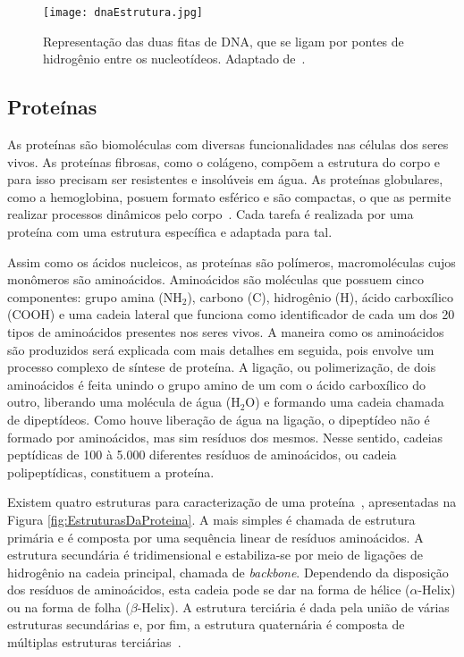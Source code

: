 \begin{figure}[h]
    \centering
    \texttt{[image: dnaEstrutura.jpg]}
    \caption{Representação das duas fitas de DNA, que se ligam por pontes de hidrogênio entre os nucleotídeos. Adaptado de~\cite{dnadiscovery08}.}
    \label{fig:EstruturasDoDNA}
\end{figure} 



\subsection{Proteínas} \label{proteinas}

\indent As proteínas são biomoléculas com diversas funcionalidades nas células dos seres vivos. As proteínas fibrosas, como o colágeno, compõem a estrutura do corpo e para isso precisam ser resistentes e insolúveis em água. As proteínas globulares, como a hemoglobina, posuem formato esférico e são compactas, o que as permite realizar processos dinâmicos pelo corpo~\cite{LauraProteinas07}. Cada tarefa é realizada por uma proteína com uma estrutura específica e adaptada para tal.

\indent Assim como os ácidos nucleicos, as proteínas são polímeros, macromoléculas cujos monômeros são aminoácidos. Aminoácidos são moléculas que possuem cinco componentes: grupo amina (NH$_{2}$), carbono (C), hidrogênio (H), ácido carboxílico (COOH) e uma cadeia lateral que funciona como identificador de cada um dos 20 tipos de aminoácidos presentes nos seres vivos. A maneira como os aminoácidos são produzidos será explicada com mais detalhes em seguida, pois envolve um processo complexo de síntese de proteína. A ligação, ou polimerização, de dois aminoácidos é feita unindo o grupo amino de um com o ácido carboxílico do outro, liberando uma molécula de água (H$_{2}$O) e formando uma cadeia chamada de dipeptídeos. Como houve liberação de água na ligação, o dipeptídeo não é formado por aminoácidos, mas sim resíduos dos mesmos. Nesse sentido, cadeias peptídicas de 100 à 5.000 diferentes resíduos de aminoácidos, ou cadeia polipeptídicas, constituem a proteína.

\indent Existem quatro estruturas para caracterização de uma proteína~\cite{setubal97}, apresentadas na Figura \ref{fig:EstruturasDaProteina}. A mais simples é chamada de estrutura primária e é composta por uma sequência linear de resíduos aminoácidos. A estrutura secundária é tridimensional e estabiliza-se por meio de ligações de hidrogênio na cadeia principal, chamada de \textit{backbone}. Dependendo da disposição dos resíduos de aminoácidos, esta cadeia pode se dar na forma de hélice ($\alpha$-Helix) ou na forma de folha ($\beta$-Helix). A estrutura terciária é dada pela união de várias estruturas secundárias e, por fim, a estrutura quaternária é composta de múltiplas estruturas terciárias~\cite{drug09}.

